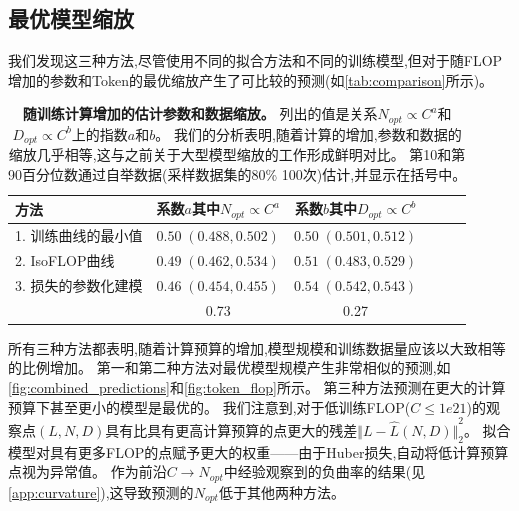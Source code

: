 \documentclass[11pt, a4paper, logo, copyright, nonumbering]{deepmind}
\begin{document}
\subsection{最优模型缩放}
\label{sec:scaling-results}
我们发现这三种方法,尽管使用不同的拟合方法和不同的训练模型,但对于随FLOP增加的参数和Token的最优缩放产生了可比较的预测(如\autoref{tab:comparison}所示)。
\begin{table}[t]
    \caption{\textbf{随训练计算增加的估计参数和数据缩放。}
    列出的值是关系$N_{opt} \propto C^a$和$D_{opt} \propto C^b$上的指数$a$和$b$。
    我们的分析表明,随着计算的增加,参数和数据的缩放几乎相等,这与之前关于大型模型缩放的工作形成鲜明对比。
    第10和第90百分位数通过自举数据(采样数据集的80\% 100次)估计,并显示在括号中。
    }
    \centering
    \begin{tabular}{lccccc}
    \toprule
    方法 & 系数$a$其中$N_{opt} \propto C^a$ & 系数$b$其中$D_{opt} \propto C^b$ \\
     \midrule
    1. 训练曲线的最小值 & $0.50 \; ({0.488}, {0.502})$ & $0.50 \; (0.501, 0.512)$ \\ 
    2. IsoFLOP曲线 & $0.49 \; (0.462, 0.534)$ &  $0.51 \; (0.483, 0.529)$ \\ 
    3. 损失的参数化建模 & $0.46\; (0.454, 0.455)$ & $0.54  \; (0.542, 0.543)$ \\ 
    \midrule
    \citet{kaplan2020scaling} & 0.73 & 0.27 \\ 
    \bottomrule
    \end{tabular}
    \label{tab:comparison}
\end{table}
所有三种方法都表明,随着计算预算的增加,模型规模和训练数据量应该以大致相等的比例增加。
第一和第二种方法对最优模型规模产生非常相似的预测,如\autoref{fig:combined_predictions}和\autoref{fig:token_flop}所示。
第三种方法预测在更大的计算预算下甚至更小的模型是最优的。
我们注意到,对于低训练FLOP($C\leq1e21$)的观察点$(L, N, D)$具有比具有更高计算预算的点更大的残差${\Vert L - \hat L(N, D) \Vert}_2^2$。
拟合模型对具有更多FLOP的点赋予更大的权重——由于Huber损失,自动将低计算预算点视为异常值。
作为前沿$C \to N_{opt}$中经验观察到的负曲率的结果(见\autoref{app:curvature}),这导致预测的$N_{opt}$低于其他两种方法。
\end{document}
